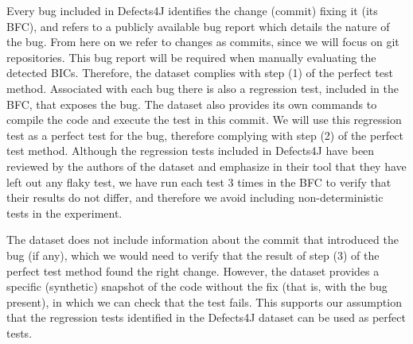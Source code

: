 Every bug included in Defects4J identifies the change (commit) fixing it (its BFC), and refers to a publicly available bug report which details the nature of the bug.
From here on we refer to changes as commits, since we will focus on git repositories.
This bug report will be required when manually evaluating the detected BICs.
Therefore, the dataset complies with step (1) of the perfect test method. 
Associated with each bug there is also a regression test, included in the BFC, that exposes the bug. 
The dataset also provides its own commands to compile the code and execute the test in this commit. 
We will use this regression test as a perfect test for the bug, therefore complying with step (2) of the perfect test method.
Although the regression tests included in Defects4J have been reviewed by the authors of the dataset and emphasize in their tool that they have left out any flaky test, we have run each test 3 times in the BFC to verify that their results do not differ, and therefore we avoid including non-deterministic tests in the experiment.

The dataset does not include information about the commit that introduced the bug (if any), which we would need to verify that the result of step (3) of the perfect test method found the right change. 
However, the dataset provides a specific (synthetic) snapshot of the code without the fix (that is, with the bug present), in which we can check that the test fails. 
This supports our assumption that the regression tests identified in the Defects4J dataset can be used as perfect tests.

